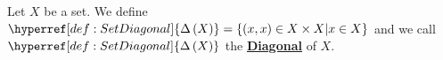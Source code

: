 \newcommand{\SetDiagonal}[0]{\textbf{\hyperref[def:SetDiagonal]{Diagonal}}\xspace}
\newcommand{\SetDiagonals}[0]{\textbf{\hyperref[def:SetDiagonal]{Diagonals}}\xspace}
\newcommand{\scSetDiagonal}[1]{\ensuremath{\hyperref[def:SetDiagonal]{\Delta\pa{#1}}}\xspace}
\begin{df}
\label{def:SetDiagonal}

\rm
    Let $X$ be a set. 
    We define 
    $\scSetDiagonal{X}=\{(x,x)\in X \times X | x \in X\}$
    and we call 
    \scSetDiagonal{X} 
    the 
    \SetDiagonal
    of $X$.
\end{df}
